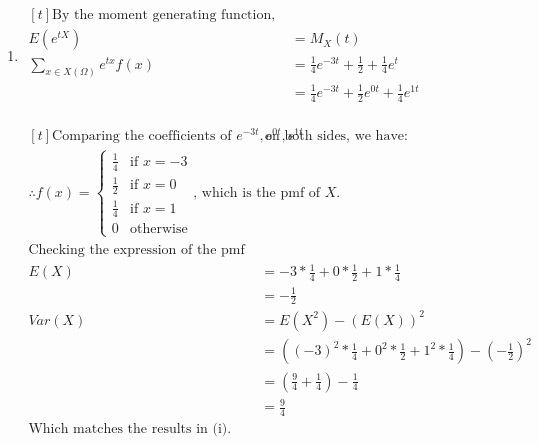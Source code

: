\documentclass{article}
\begin{document}
\begin{enumerate}
\begin{enumerate}[label=(\roman*)]
    \item $\begin{aligned}[t]
    \text{By the moment generating function, } \\
    E(e^{tX}) &= M_X(t) \\
    \sum_{x \in X(\Omega)} e^{tx} f(x) &= \frac{1}{4}e^{-3t} + \frac{1}{2} + \frac{1}{4}e^t \\
    &= \frac{1}{4}e^{-3t} + \frac{1}{2}e^{0t} + \frac{1}{4}e^{1t} \\
    \end{aligned}$

    $\begin{aligned}[t]
    \text{Comparing the coefficients of } e^{-3t}, e^{0t}, e^{1t} & \text{ on both sides, we have:} \\
    \therefore f(x) = \begin{cases}
        \frac{1}{4} & \text{if } x = -3 \\
        \frac{1}{2} & \text{if } x = 0 \\
        \frac{1}{4} & \text{if } x = 1 \\
        0 & \text{otherwise}
    \end{cases}
    \text{, which is the pmf of } X. \\
    \text{Checking the expression of the pmf by (i), we have:} \\
    E(X) &= -3*\frac{1}{4} + 0*\frac{1}{2} + 1*\frac{1}{4} \\
    &= -\frac{1}{2} \\
    Var(X) &= E(X^2) - (E(X))^2 \\
    &= ((-3)^2*\frac{1}{4} + 0^2*\frac{1}{2} + 1^2*\frac{1}{4}) - (-\frac{1}{2})^2 \\
    &= (\frac{9}{4} + \frac{1}{4}) - \frac{1}{4} \\
    &= \frac{9}{4} \\
    \text{Which matches the results in (i).} \\
    \end{aligned}$
    \end{enumerate}


\end{enumerate}
\end{document}
